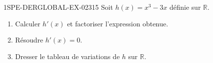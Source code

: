 \begin{exercice}{1SPE-DERGLOBAL-EX-023}{1}{5}
Soit $h(x) = x^3 - 3x$ définie sur $\mathbb{R}$.
\begin{enumerate}
\item Calculer $h'(x)$ et factoriser l'expression obtenue.
\item Résoudre $h'(x) = 0$.
\item Dresser le tableau de variations de $h$ sur $\mathbb{R}$.
\end{enumerate}
\end{exercice}

